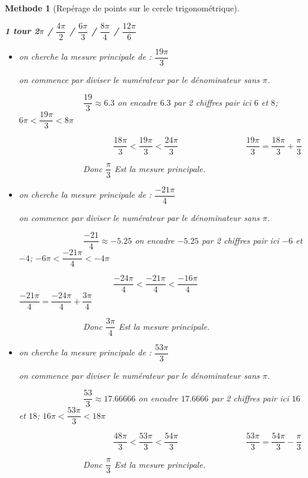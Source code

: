 \documentclass[10pt,a4paper]{article}
\theoremstyle{break}
\newtheorem{Meth}{Methode}
\begin{document}
\begin{Meth}[Repérage de points sur le cercle trigonométrique]
\begin{enumerate}
				\textit{\textbf{1 tour 2$\pi$ / $\dfrac{4\pi}{2}$ / $\dfrac{6\pi}{3}$ / $\dfrac{8\pi}{4}$ / $\dfrac{12\pi}{6}$}}

			\begin{itemize}
				\item on cherche la mesure principale de : $\dfrac{19\pi}{3}$\par
				on commence par diviser le numérateur par le dénominateur sans $\pi$.\par
				~~~~~~~~~~~~~~~$\dfrac{19}{3} \approx 6.3$ on encadre $6.3$ par 2 chiffres pair ici $6$ et $8$; $6\pi<\dfrac{19\pi}{3}<8\pi$	\par
				~~~~~~~~~~~~~~~~~~~~~~$\dfrac{18\pi}{3}<\dfrac{19\pi}{3}<\dfrac{24\pi}{3}$
				~~~~~~~~~~~~~~~$\dfrac{19\pi}{3}=\dfrac{18\pi}{3}+\dfrac{\pi}{3}$\par
				~~~~~~~~~~~~~~~Donc $\dfrac{\pi}{3}$ Est la mesure principale.
		\end{itemize}
			\begin{itemize}
				\item on cherche la mesure principale de : $\dfrac{-21\pi}{4}$\par
				on commence par diviser le numérateur par le dénominateur sans $\pi$.\par
				~~~~~~~~~~~~~~~$\dfrac{-21}{4} \approx -5.25$ on encadre $-5.25$ par 2 chiffres pair ici $-6$ et $-4$; $-6\pi<\dfrac{-21\pi}{4}<-4\pi$	\par
				~~~~~~~~~~~~~~~~~~~~~~$\dfrac{-24\pi}{4}<\dfrac{-21\pi}{4}<\dfrac{-16\pi}{4}$
				~~~~~~~~~~~~~~~$\dfrac{-21\pi}{4}=\dfrac{-24\pi}{4}+\dfrac{3\pi}{4}$\par
				~~~~~~~~~~~~~~~Donc $\dfrac{3\pi}{4}$ Est la mesure principale.
		\end{itemize}
			\begin{itemize}
				\item on cherche la mesure principale de : $\dfrac{53\pi}{3}$\par
				on commence par diviser le numérateur par le dénominateur sans $\pi$.\par
				~~~~~~~~~~~~~~~$\dfrac{53}{3} \approx 17.66666$ on encadre $17.6666$ par 2 chiffres pair ici $16$ et $18$; $16\pi<\dfrac{53\pi}{3}<18\pi$	\par
				~~~~~~~~~~~~~~~~~~~~~~$\dfrac{48\pi}{3}<\dfrac{53\pi}{3}<\dfrac{54\pi}{3}$
				~~~~~~~~~~~~~~~$\dfrac{53\pi}{3}=\dfrac{54\pi}{3}-\dfrac{\pi}{3}$\par
				~~~~~~~~~~~~~~~Donc $\dfrac{\pi}{3}$ Est la mesure principale.
		\end{itemize}
			\end{enumerate}
		\end{Meth}
	\newpage
\end{document}

